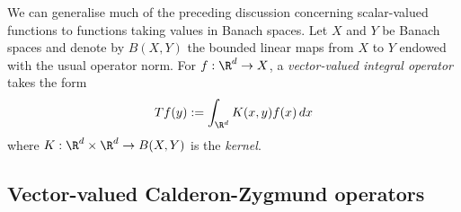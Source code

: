 \documentclass[reqno]{amsart}
\newtheorem{theorem}{Theorem}
\theoremstyle{definition}
\theoremstyle{remark}
\begin{document}
We can generalise much of the preceding discussion concerning scalar-valued functions to functions taking values in Banach spaces. Let $X$ and $Y$ be Banach spaces and denote by $B(X, Y)$ the bounded linear maps from $X$ to $Y$ endowed with the usual operator norm. For $f : \R^d \to X$, a \textit{vector-valued integral operator} takes the form
	\[ Tf(y) := \int_{\R^d} K(x, y) f(x) \, dx \]
where $K : \R^d \times \R^d \to B(X, Y)$ is the \textit{kernel}. 

\subsection{Vector-valued Calderon-Zygmund operators}
\end{document}
